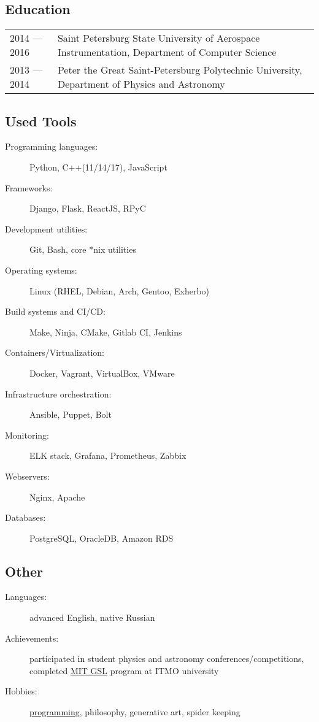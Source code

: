 \documentclass[10pt]{report}
\begin{document}
\vspace{5mm}

\subsection*{Education}
\begin{table}[H]
    \begin{tabular}{@{}p{}p{}}
        2014 --- 2016 & Saint Petersburg State University of Aerospace Instrumentation, Department of Computer Science \\
        2013 --- 2014 & Peter the Great Saint-Petersburg Polytechnic University, Department of Physics and Astronomy
    \end{tabular}
\end{table}

\goodbreak

\subsection*{Used Tools}
\begin{description}
    \item[Programming languages:]
    Python, C++(11/14/17), JavaScript
    \item[Frameworks:]
    Django, Flask, ReactJS, RPyC
    \item[Development utilities:]
    Git, Bash, core *nix utilities
    \item[Operating systems:]
    Linux (RHEL, Debian, Arch, Gentoo, Exherbo)
    \item[Build systems and CI/CD:]
    Make, Ninja, CMake, Gitlab CI, Jenkins
    \item[Containers/Virtualization:]
    Docker, Vagrant, VirtualBox, VMware
    \item[Infrastructure orchestration:]
    Ansible, Puppet, Bolt
    \item[Monitoring:]
    ELK stack, Grafana, Prometheus, Zabbix
    \item[Webservers:]
    Nginx, Apache
    \item[Databases:]
    PostgreSQL, OracleDB, Amazon RDS
\end{description}

\subsection*{Other}
\begin{description}
    \item[Languages:]
    advanced English, native Russian
    \item[Achievements:]
    participated in student physics and astronomy conferences/competitions,
    completed \href{https://gsl.mit.edu/}{MIT GSL} program at ITMO university
    \item[Hobbies:]
    \href{https://github.com/unsip}{programming}, philosophy, generative art, spider keeping
\end{description}
\end{document}
